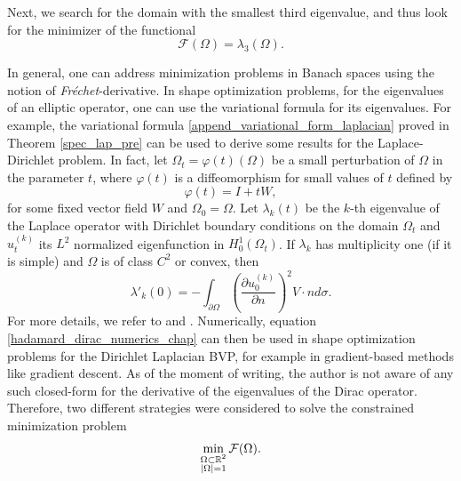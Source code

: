 Next, we search for the domain with the smallest third eigenvalue, and thus look for the minimizer of the functional
\begin{equation*}%
    \mathcal{F}(\Omega) = \lambda_3(\Omega).
\end{equation*}

In general, one can address minimization problems in Banach spaces using the notion of \textit{Fréchet}-derivative. In shape optimization problems, for the eigenvalues of an elliptic operator, one can use the variational formula for its eigenvalues. For example, the variational formula \eqref{append_variational_form_laplacian} proved in Theorem \ref{spec_lap_pre} can be used to derive some results for the Laplace-Dirichlet problem. In fact, let \(\Omega_t = \varphi(t)(\Omega)\) be a small perturbation of \(\Omega\) in the parameter \(t\), where \(\varphi(t)\) is a diffeomorphism for small values of \(t\) defined by
\begin{equation}\label{dirac_perturbation_chapter_5}
    \varphi(t) = I + t W,
\end{equation}
for some fixed vector field \(W\) and \(\Omega_0 = \Omega\). Let  \(\lambda_k(t)\) be the \(k\)-th eigenvalue of the Laplace operator with Dirichlet boundary conditions on the domain \(\Omega_t\) and \(u^{(k)}_t\) its \(L^2\) normalized eigenfunction in \(H^1_0(\Omega_t)\). If \(\lambda_k\) has multiplicity one (if it is simple) and \(\Omega\) is of class \(C^2\) or convex, then
\begin{equation}\label{hadamard_dirac_numerics_chap}
    \lambda'_k(0) =- \int_{\partial\Omega} \left(\frac{\partial u^{(k)}_0}{\partial n}\right)^2 V\cdot n d \sigma.
\end{equation}
For more details, we refer to \cite{henrot2006extremum} and \cite{kato2013perturbation}. Numerically, equation \eqref{hadamard_dirac_numerics_chap} can then be used in shape optimization problems for the Dirichlet Laplacian \ac{BVP}, for example in gradient-based methods like gradient descent.
As of the moment of writing, the author is not aware of any such closed-form for the derivative of the eigenvalues of the Dirac operator. Therefore, two different strategies were considered to solve the constrained minimization problem
\begin{equation}\label{dirac_unconstrained_min_lambda_3}
    \min_{\substack{\Omega \subset \mathbb{R}^2 \\ \abs{\Omega}=1}} \mathcal{F}(\Omega).
\end{equation}

